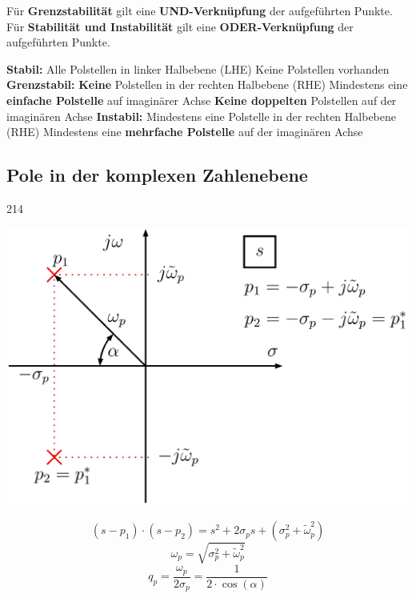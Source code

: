 Für \textbf{Grenzstabilität} gilt eine \textbf{UND-Verknüpfung} der aufgeführten Punkte. 
Für \textbf{Stabilität und Instabilität} gilt eine \textbf{ODER-Verknüpfung} der aufgeführten Punkte.

\begin{outline}
    \1 \textbf{Stabil:} 
        \2 Alle Polstellen in linker Halbebene (LHE)
        \2 Keine Polstellen vorhanden 
    \1 \textbf{Grenzstabil:} 
        \2 \textbf{Keine} Polstellen in der rechten Halbebene (RHE)
        \2 Mindestens eine \textbf{einfache Polstelle} auf imaginärer Achse
        \2 \textbf{Keine doppelten} Polstellen auf der imaginären Achse
    \1 \textbf{Instabil:} 
        \2 Mindestens eine Polstelle in der rechten Halbebene (RHE)
        \2 Mindestens eine \textbf{mehrfache Polstelle} auf der imaginären Achse
\end{outline}


\subsection{Pole in der komplexen Zahlenebene}{214}


\begin{minipage}[c]{0.45\columnwidth}
    \includegraphics[width=\columnwidth]{images/beispiel_pol_nullstellen_diagramm.png}
\end{minipage}
\hfill
\begin{minipage}[c]{0.48\columnwidth}
    $$(s - p_1) \cdot (s -p_2) = s^2 + 2 \sigma_p s + (\sigma_p^2 + \tilde{\omega}_p^2) $$
    $$ \boxed{ \omega_p = \sqrt{\sigma_p^2 + \tilde{\omega}_p^2}} $$
    $$ \boxed{ q_p = \frac{\omega_p}{2 \sigma_p} = \frac{1}{2 \cdot \cos(\alpha)}} $$
\end{minipage}

